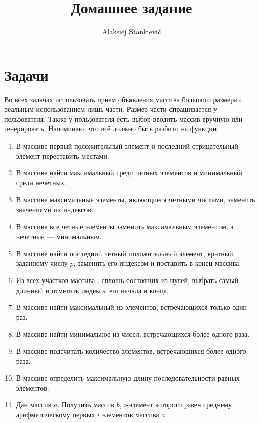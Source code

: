 \documentclass[12pt]{article}
\author{Alaksiej Stankievič}
\title{Домашнее задание}
\begin{document}


\section{Задачи}

Во всех задачах использовать прием объявления массива большого размера с реальным использованием лишь части. Размер
части спрашивается у пользователя. Также у пользователя есть выбор вводить массив вручную или генерировать. Напоминаю,
что всё должно быть разбито на функции.

\begin{enumerate}
  \item В массиве первый положительный элемент и последний отрицательный элемент переставить местами.
  \item В массиве найти максимальный среди четных элементов и минимальный среди нечетных.
  \item В массиве максимальные элементы, являющиеся четными числами, заменить значениями их индексов.
  \item В массиве все четные элементы заменить максимальным элементом,  а нечетные --- минимальным.
  \item В массиве найти последний четный положительный элемент, кратный заданному числу $p$, заменить его
индексом и поставить в  конец массива.
  \item Из всех участков массива , сплошь состоящих из нулей, выбрать самый длинный и отметить индексы его начала и
конца.
  \item В массиве найти максимальный из элементов, встречающихся только один раз.
  \item В массиве найти минимальное из чисел, встречающихся более одного раза.
  \item В массиве подсчитать количество элементов, встречающихся более одного раза.
  \item В массиве определить максимальную длину последовательности равных элементов.
  \item Дан массив $a$. Получить массив $b$, $i$-элемент которого равен среднему арифметическому первых $i$ элементов
массива  $a$.
\end{enumerate}
\end{document}
